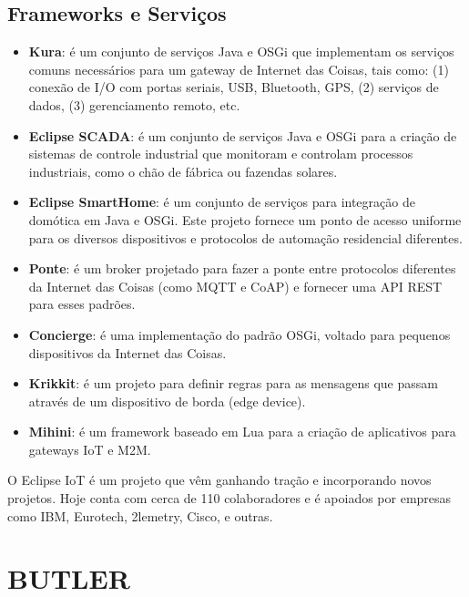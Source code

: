 \subsection{Frameworks e Serviços}
\begin{itemize}
\item \textbf{Kura}: é um conjunto de serviços Java e OSGi que implementam
os serviços comuns necessários para um gateway de Internet das Coisas,
tais como: (1) conexão de I/O com portas seriais, USB, Bluetooth,
GPS, (2) serviços de dados, (3) gerenciamento remoto, etc.
\item \textbf{Eclipse SCADA}: é um conjunto de serviços Java e OSGi para
a criação de sistemas de controle industrial que monitoram e controlam
processos industriais, como o chão de fábrica ou fazendas solares.
\item \textbf{Eclipse SmartHome}: é um conjunto de serviços para integração
de domótica em Java e OSGi. Este projeto fornece um ponto de acesso
uniforme para os diversos dispositivos e protocolos de automação residencial
diferentes.
\item \textbf{Ponte}: é um broker projetado para fazer a ponte entre protocolos
diferentes da Internet das Coisas (como MQTT e CoAP) e fornecer uma
API REST para esses padrões.
\item \textbf{Concierge}: é uma implementação do padrão OSGi, voltado para
pequenos dispositivos da Internet das Coisas.
\item \textbf{Krikkit}: é um projeto para definir regras para as mensagens
que passam através de um dispositivo de borda (edge device).
\item \textbf{Mihini}: é um framework baseado em Lua para a criação de aplicativos
para gateways IoT e M2M.
\end{itemize}
O Eclipse IoT é um projeto que vêm ganhando tração e incorporando
novos projetos\cite{eclipse:iot:projects}. Hoje conta com cerca de
110 colaboradores e é apoiados por empresas como IBM, Eurotech, 2lemetry,
Cisco, e outras.

\section{BUTLER}

